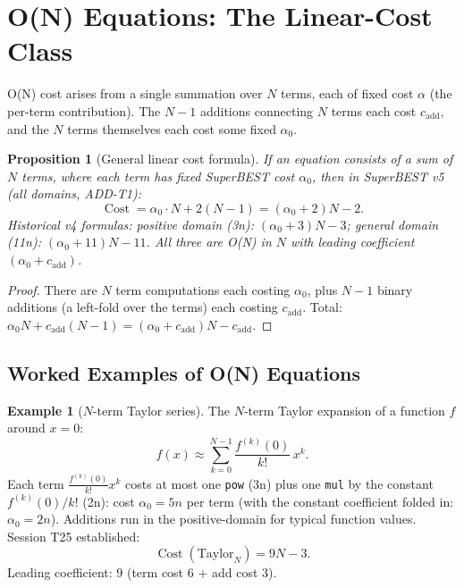 \documentclass[12pt,a4paper]{article}
\newtheorem{proposition}[theorem]{Proposition}
\theoremstyle{definition}
\newtheorem{example}[theorem]{Example}
\newcommand{\Cost}{\operatorname{Cost}}
\begin{document}
\section{O(N) Equations: The Linear-Cost Class}
\label{sec:ON}

O(N) cost arises from a single summation over $N$ terms, each of
fixed cost $\alpha$ (the per-term contribution).  The $N-1$ additions
connecting $N$ terms each cost $c_{\mathrm{add}}$, and the $N$ terms
themselves each cost some fixed $\alpha_0$.

\begin{proposition}[General linear cost formula]
\label{prop:linear_formula}
If an equation consists of a sum of $N$ terms, where each term has
fixed SuperBEST cost $\alpha_0$, then in SuperBEST v5 (all domains, ADD-T1):
\[
  \Cost = \alpha_0 \cdot N + 2(N-1) = (\alpha_0 + 2)N - 2.
\]
Historical v4 formulas: positive domain (3n): $(\alpha_0+3)N-3$;
general domain (11n): $(\alpha_0+11)N-11$.
All three are O(N) in $N$ with leading coefficient $(\alpha_0 + c_{\mathrm{add}})$.
\end{proposition}

\begin{proof}
There are $N$ term computations each costing $\alpha_0$, plus $N-1$
binary additions (a left-fold over the terms) each costing
$c_{\mathrm{add}}$.  Total: $\alpha_0 N + c_{\mathrm{add}}(N-1)
= (\alpha_0 + c_{\mathrm{add}})N - c_{\mathrm{add}}$.
\end{proof}

\subsection{Worked Examples of O(N) Equations}

\begin{example}[$N$-term Taylor series]
\label{ex:taylor}
The $N$-term Taylor expansion of a function $f$ around $x=0$:
\[
  f(x) \approx \sum_{k=0}^{N-1} \frac{f^{(k)}(0)}{k!}\, x^k.
\]
Each term $\frac{f^{(k)}(0)}{k!} x^k$ costs at most one \texttt{pow}
(3n) plus one \texttt{mul} by the constant $f^{(k)}(0)/k!$ (2n): cost
$\alpha_0 = 5n$ per term (with the constant coefficient folded in:
$\alpha_0 = 2n$).  Additions run in the positive-domain for typical
function values.  Session T25 established:
\[
  \boxed{\Cost(\text{Taylor}_N) = 9N - 3.}
\]
Leading coefficient: $9$ (term cost 6 + add cost 3).
\end{example}
\end{document}
